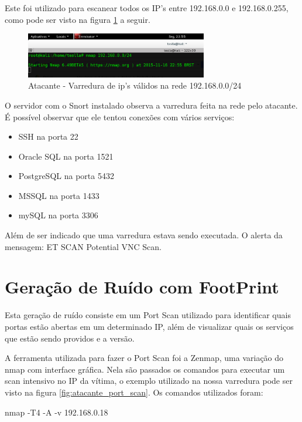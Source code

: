 Este foi utilizado para escanear todos os IP's entre
192.168.0.0 e 192.168.0.255, como pode ser visto na figura \ref{fig:atacante_varredura} a seguir.

	\begin{figure}[h]
	 \centering
	 \includegraphics[width=300px, scale=1]{resource/atacante_varredura}
	 \caption{Atacante - Varredura de ip's válidos na rede 192.168.0.0/24}
 \label{fig:atacante_varredura}
 \end{figure}

O servidor com o Snort instalado observa a varredura feita na rede pelo atacante.
É possível observar que ele tentou conexões com vários serviços:

\begin{itemize}
	\item SSH na porta 22
	\item Oracle SQL na porta 1521
	\item PostgreSQL na porta 5432
	\item MSSQL na porta 1433
	\item mySQL na porta 3306
\end{itemize}


	 Além de ser indicado que uma varredura estava sendo executada. O alerta da mensagem:
	 ET SCAN Potential VNC Scan.

	 \section{Geração de Ruído com FootPrint}
	 \label{sec:Geracao_de_Ruido_com_FootPrint}
	 Esta geração de ruído consiste em um Port Scan utilizado para identificar quais
	 portas estão abertas em um determinado IP, além de visualizar quais os serviços
	 que estão sendo providos e a versão.

	 A ferramenta utilizada para fazer o Port Scan foi a Zenmap, uma variação do nmap
	 com interface gráfica. Nela são passados os comandos para executar um scan
	 intensivo no IP da vítima, o exemplo utilizado na nossa varredura pode ser
	 visto na figura \ref{fig:atacante_port_scan}. Os comandos utilizados foram:

	 \begin{framed}
		 nmap -T4 -A -v 192.168.0.18
	 \end{framed}


